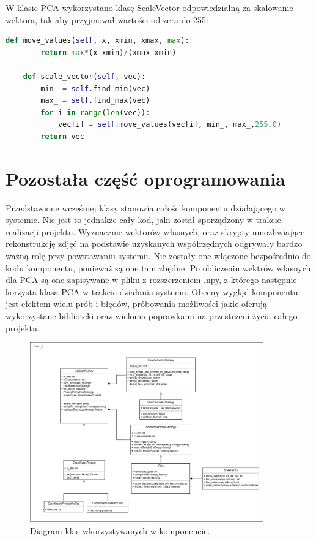 \documentclass[oneside, eng]{mgr}
\begin{document}
W klasie PCA wykorzystano klasę ScaleVector odpowiedzialną za skalowanie wektora, tak aby przyjmował wartości od zera do 255:

\begin{lstlisting}[language=Python]
    def move_values(self, x, xmin, xmax, max):
        return max*(x-xmin)/(xmax-xmin)

    def scale_vector(self, vec):
        min_ = self.find_min(vec)
        max_ = self.find_max(vec)
        for i in range(len(vec)):
            vec[i] = self.move_values(vec[i], min_, max_,255.0)
        return vec

\end{lstlisting}

\section{Pozostała część oprogramowania}
Przedstawione wcześniej klasy stanowią całośc komponentu działającego w systemie. Nie jest to jednakże cały kod, jaki został sporządzony w trakcie realizacji projektu. Wyznacznie wektorów własnych, oraz skrypty umożliwiające rekonstrukcję zdjęć na podstawie uzyskanych współrzędnych odgrywały bardzo ważną rolę przy powstawaniu systemu. Nie zostały one włączone bezpośrednio do kodu komponentu, ponieważ są one tam zbędne. Po obliczeniu wektrów własnych dla PCA są one zapisywane w pliku z rozszerzeniem .npy, z którego następnie korzysta klasa PCA w trakcie działania systemu. Obecny wygląd komponentu jest efektem wielu prób i błędów, próbowania możliwości jakie oferują wykorzystane biblioteki oraz wieloma poprawkami na przestrzeni życia całego projektu.

\begin{figure}
\centering
	\includegraphics[width=0.90\textwidth]{Diagram.jpg}\par\vspace{1cm}
\caption{Diagram klas wkorzystywanych w komponencie.}
	\label{fig:diagram_klas}
\end{figure}
\end{document}
